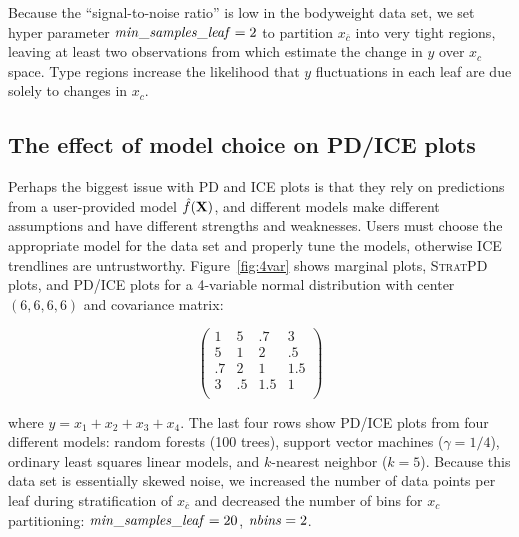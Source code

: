 \documentclass[12pt]{article}
\newcommand{\figref}[1]{Figure~\ref{#1}}
\newcommand{\spd}{\fontfamily{cmr}\textsc{\small StratPD}}
\newcommand{\xnc}{$x_{\overline{c}}$}
\begin{document}
Because the ``signal-to-noise ratio'' is low in the bodyweight data set, we set hyper parameter ${\it min\_samples\_leaf}=2$ to partition \xnc{} into very tight regions, leaving at least two observations from which estimate the change in $y$ over $x_c$ space. Type regions increase the likelihood that $y$ fluctuations in each leaf are due solely to changes in $x_c$.

\subsection{The effect of model choice on PD/ICE plots}

Perhaps the biggest issue with PD and ICE plots is that they rely on predictions from a user-provided model $\hat{f}(\bf X)$, and different models make different assumptions and have different strengths and weaknesses.  Users must choose the appropriate model for the data set and properly tune the models, otherwise ICE trendlines are untrustworthy. \figref{fig:4var} shows marginal plots, \spd{} plots, and PD/ICE plots for a 4-variable normal distribution with center $(6, 6, 6, 6)$ and covariance matrix:

\[
\left(
\begin{array}{cccc}
1 & 5 &.7 & 3\\
5 &1 &2 &.5\\
.7 &2 & 1 & 1.5\\
3 &.5 &1.5 &1\\
\end{array}
\right)
\]

\noindent where $y = x_1 + x_2 + x_3 + x_4$.  The last four rows show PD/ICE plots from four different models: random forests (100 trees), support vector machines ($\gamma=1/4$), ordinary least squares linear models, and $k$-nearest neighbor ($k=5$).  Because this data set is essentially skewed noise, we increased the number of data points per leaf during stratification of \xnc{} and decreased the number of bins for $x_c$ partitioning: ${\it min\_samples\_leaf} = 20$, ${\it nbins} = 2$.
\end{document}

